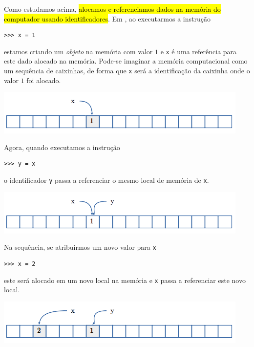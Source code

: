 Como estudamos acima, \hl{alocamos e referenciamos dados na memória do computador usando identificadores}. Em {\python}, ao executarmos a instrução
\begin{lstlisting}
>>> x = 1
\end{lstlisting}
estamos criando um \emph{objeto} na memória com valor $1$ e \lstinline+x+ é uma referência para este dado alocado na memória. Pode-se imaginar a memória computacional como um sequência de caixinhas, de forma que \lstinline+x+ será a identificação da caixinha onde o valor $1$ foi alocado.

\begin{center}
  \includegraphics[width=\textwidth]{./cap_lingua/dados/fig_aloc_mem/xRecebe1}
\end{center}

Agora, quando executamos a instrução
\begin{lstlisting}
>>> y = x 
\end{lstlisting}
o identificador \lstinline+y+ passa a referenciar o mesmo local de memória de \lstinline+x+.

\begin{center}
  \includegraphics[width=\textwidth]{./cap_lingua/dados/fig_aloc_mem/yRecebex}
\end{center}

Na sequência, se atribuirmos um novo valor para \lstinline+x+
\begin{lstlisting}
>>> x = 2
\end{lstlisting}
este será alocado em um novo local na memória e \lstinline+x+ passa a referenciar este novo local.

\begin{center}
  \includegraphics[width=\textwidth]{./cap_lingua/dados/fig_aloc_mem/xRecebe2}
\end{center}

